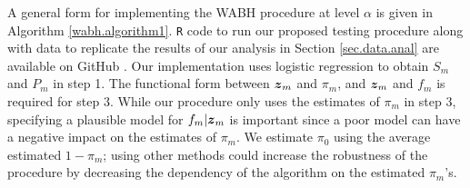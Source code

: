 \documentclass[bimj,fleqn]{w-art}
\newcommand{\mbf}[1]{\mbox{\boldmath${#1}$}}
\theoremstyle{plain}
\theoremstyle{definition}
\begin{document}
A general form for implementing the WABH procedure at level $\alpha$ is given in Algorithm \ref{wabh.algorithm1}. \texttt{R} code to run our proposed testing procedure along with data to replicate the results of our analysis in Section \ref{sec.data.anal} are available on GitHub \citep{McLZhe22}. Our implementation uses logistic regression to obtain $S_m$ and $P_m$ in step 1. The functional form between $\mbf{z}_m$ and $\pi_m$, and $\mbf{z}_m$ and $f_m$ is required for step 3. While our procedure only uses the estimates of $\pi_m$ in step 3, specifying a plausible model for $f_m|\mbf{z}_m$ is important since a poor model can have a negative impact on the estimates of $\pi_m$.  We estimate $\pi_0$ using the average estimated $1-\pi_m$; using other methods \citep[e.g.][]{Sto02} could increase the robustness of the procedure by decreasing the dependency of the algorithm on the estimated $\pi_m$'s. 
\end{document}
